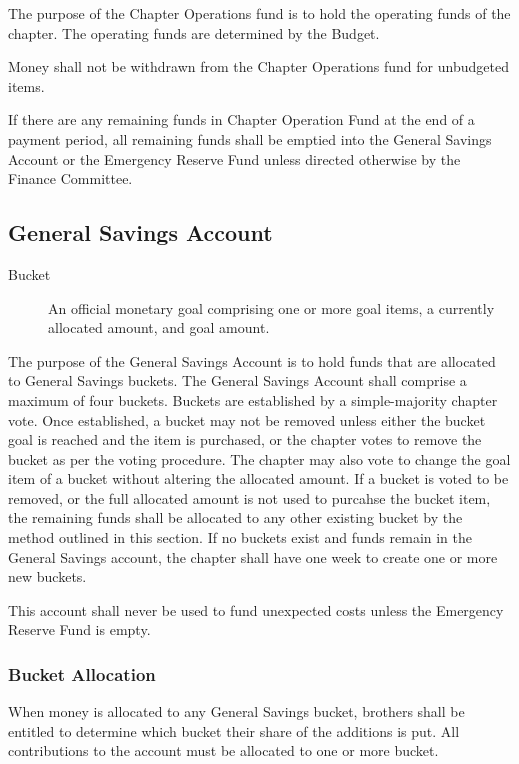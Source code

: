 The purpose of the Chapter Operations fund is to hold the operating funds of the
chapter.  The operating funds are determined by the Budget.

Money shall not be withdrawn from the Chapter Operations fund for unbudgeted
items.

If there are any remaining funds in Chapter Operation Fund at the end of a
payment period, all remaining funds shall be emptied into the General Savings
Account or the Emergency Reserve Fund unless directed otherwise by the Finance
Committee.

\subsection{General Savings Account}
\label{sec:general-savings-account}

\begin{description}
    \item[Bucket] An official monetary goal comprising one or more goal items, a
    currently allocated amount, and goal amount.
\end{description}

The purpose of the General Savings Account is to hold funds that are allocated
to General Savings buckets.
The General Savings Account shall comprise a maximum of four buckets.
Buckets are established by a simple-majority chapter vote.
Once established, a bucket may not be removed unless either the bucket goal is
reached and the item is purchased, or the chapter votes to remove the bucket as
per the voting procedure.
The chapter may also vote to change the goal item of a
bucket without altering the allocated amount.
If a bucket is voted to be removed, or the full allocated amount is not used to
purcahse the bucket item, the remaining funds shall be allocated to any other
existing bucket by the method outlined in this section.
If no buckets exist and funds remain in the General Savings account, the
chapter shall have one week to create one or more new buckets.

This account shall never be used to fund unexpected costs unless the
Emergency Reserve Fund is empty.

\subsubsection{Bucket Allocation}
\label{sec:bucket-allocation}

When money is allocated to any General Savings bucket, brothers shall be
entitled to determine which bucket their share of the additions is put.
All contributions to the account must be allocated to one or more bucket.

